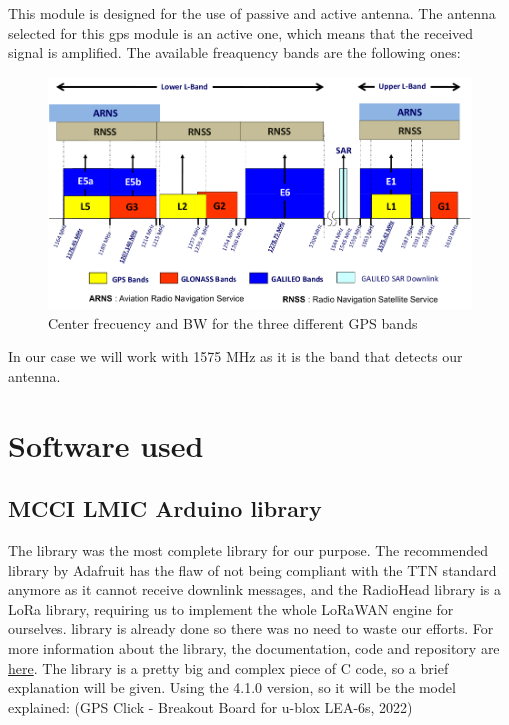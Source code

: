 This module is designed for the use of passive and active antenna. The antenna selected for this gps module is an 
active one, which means that the received signal is amplified. The available freaquency bands are the following ones:

\begin{figure}
    \includegraphics[width = \linewidth]{GPS_frequency_bands.png}
    \caption{Center frecuency and BW for the three different GPS bands}
\end{figure}

In our case we will work with 1575 MHz as it is the band that detects our antenna.



\section{Software used}
\label{sec:s-m-soft}

\subsection{MCCI LMIC Arduino library}
\label{sec:s-m-lmic}

The  library was the most complete library for
our purpose. The recommended library by Adafruit has the flaw of not
being compliant with the TTN standard anymore as it cannot receive
downlink messages, and the RadioHead library is a LoRa library,
requiring us to implement the whole LoRaWAN engine for ourselves.
 library is already done so there was no need to
waste our efforts. For more information about the library, the
documentation, code and repository are 
\href{https://github.com/mcci-catena/arduino-lmic.}{here}. The library is a pretty big and complex piece of C code, so a brief
explanation will be given.
Using the 4.1.0 version, so it will be the model explained:
(GPS Click - Breakout Board for u-blox LEA-6s, 2022)

